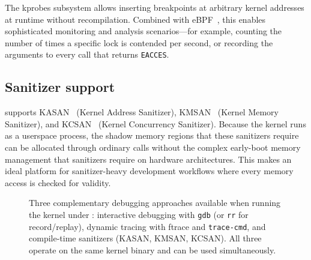 The kprobes subsystem allows inserting breakpoints at arbitrary kernel
addresses at runtime without recompilation.  Combined with eBPF~\cite{ebpf},
this enables sophisticated monitoring and analysis scenarios---for
example, counting the number of times a specific lock is contended per
second, or recording the arguments to every  call that
returns \texttt{EACCES}.

\subsection{Sanitizer support}

\UML{} supports KASAN~\cite{kasan} (Kernel Address Sanitizer),
KMSAN~\cite{kmsan} (Kernel Memory Sanitizer), and
KCSAN~\cite{kcsan} (Kernel Concurrency Sanitizer).  Because the
kernel runs as a userspace process, the shadow memory regions that
these sanitizers require can be allocated through ordinary
 calls without the complex early-boot memory management
that sanitizers require on hardware architectures.  This makes \UML{}
an ideal platform for sanitizer-heavy development workflows where
every memory access is checked for validity.

\begin{figure}[ht]
\centering
{}
\caption[Kernel debugging ecosystem under UML]{%
  Three complementary debugging approaches available when running the
  kernel under \UML{}: interactive debugging with \texttt{gdb} (or
  \texttt{rr} for record/replay), dynamic tracing with ftrace and
  \texttt{trace-cmd}, and compile-time sanitizers (KASAN, KMSAN, KCSAN).
  All three operate on the same kernel binary and can be used
  simultaneously.
}
\label{fig:app-debug-ecosystem}
\end{figure}



